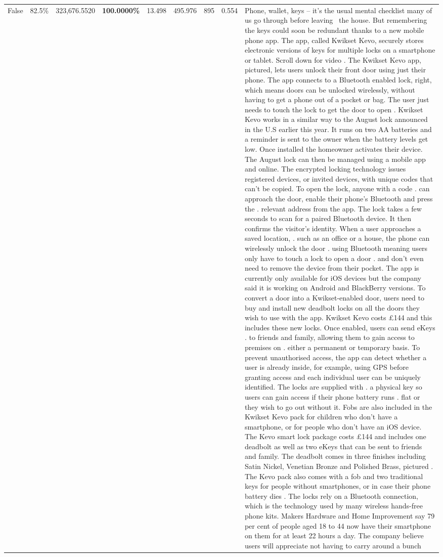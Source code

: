 \begin{table}[H]
\begin{tabular}{lllrlllll}
False & 82.5\% & 323,676.5520 & \bfseries \color{red} 100.0000\% & 13.498 & 495.976 & 895 & 0.554 & Phone, wallet, keys – it’s the usual mental checklist many of us go through before leaving  the house. But remembering the keys could soon be redundant thanks to a new mobile phone app. The app, called Kwikset Kevo, securely stores electronic versions of keys for multiple locks on a smartphone or tablet. Scroll down for video . The Kwikset Kevo app, pictured, lets users unlock their front door using just their phone. The app connects to a Bluetooth enabled lock, right, which means doors can be unlocked wirelessly, without having to get a phone out of a pocket or bag. The user just needs to touch the lock to get the door to open . Kwikset Kevo works in a similar way to the August lock announced in the U.S earlier this year. It runs on two AA batteries and a reminder is sent to the owner when the battery levels get low. Once installed the homeowner activates their device. The August lock can then be managed using a mobile app and online. The encrypted locking technology issues registered devices, or invited devices, with unique codes that can't be copied. To open the lock, anyone with a code . can approach the door, enable their phone's Bluetooth and press the . relevant address from the app. The lock takes a few seconds to scan for a paired Bluetooth device. It then confirms the visitor's identity. When a user approaches a saved location, . such as an office or a house, the phone can wirelessly unlock the door . using Bluetooth meaning users only have to touch a lock to open a door . and don't even need to remove the device from their pocket. The app is currently only available for iOS devices but the company said it is working on Android and BlackBerry versions. To convert a door into a Kwikset-enabled door, users need to buy and install new deadbolt locks on all the doors they wish to use with the app. Kwikset Kevo costs £144 and this includes these new locks. Once enabled, users can send eKeys . to friends and family, allowing them to gain access to premises on . either a permanent or temporary basis. To prevent unauthorised access, the app can detect whether a user is already inside, for example, using GPS before granting access and each individual user can be uniquely identified. The locks are supplied with . a physical key so users can gain access if their phone battery runs . flat or they wish to go out without it. Fobs are also included in the Kwikset Kevo pack for children who don't have a smartphone, or for people who don't have an iOS device. The Kevo smart lock package costs £144 and includes one deadbolt as well as two eKeys that can be sent to friends and family. The deadbolt comes in three finishes including Satin Nickel, Venetian Bronze and Polished Brass, pictured . The Kevo pack also comes with a fob and two traditional keys for people without smartphones, or in case their phone battery dies . The locks rely on a Bluetooth connection, which is the technology used by many wireless hands-free phone kits. Makers Hardware and Home Improvement say 79 per cent of people aged 18 to 44 now have their smartphone on them for at least 22 hours a day. The company believe users will appreciate not having to carry around a bunch 
\end{tabular}
\end{table}
